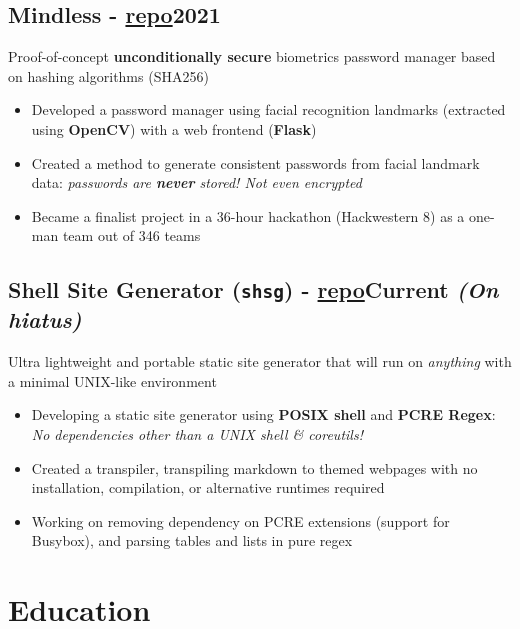 \documentclass[9pt]{article}
\begin{document}
\subsection{Mindless \normalsize\textnormal{- \href{https://github.com/ianayl/mindless}{repo}}\hfill \normalsize\textnormal{2021}}
    Proof-of-concept \textbf{unconditionally secure} biometrics password manager based on hashing algorithms (SHA256)
    \vspace{-0.5em}
\begin{itemize}
  \item Developed a password manager using facial recognition landmarks (extracted using \textbf{OpenCV}) with a web frontend (\textbf{Flask})
  \item Created a method to generate consistent passwords from facial landmark data: \textit{passwords are \textbf{never} stored! Not even encrypted}
    \item Became a finalist project in a 36-hour hackathon (Hackwestern 8) as a one-man team out of 346 teams
\end{itemize}


\subsection{Shell Site Generator (\texttt{shsg}) \normalsize\textnormal{- \href{https://github.com/ianayl/shsg}{repo}}\hfill \normalsize\textnormal{Current \textit{(On hiatus)}}}
  Ultra lightweight and portable static site generator that will run on \textit{anything} with a minimal UNIX-like environment
\vspace{-0.5em}
\begin{itemize}
  \item Developing a static site generator using \textbf{POSIX shell} and \textbf{PCRE Regex}: \textit{No dependencies other than a UNIX shell \& coreutils!}
  \item Created a transpiler, transpiling markdown to themed webpages with no installation, compilation, or alternative runtimes required
    \item Working on removing dependency on PCRE extensions (support for Busybox), and parsing tables and lists in pure regex
\end{itemize}

\section{Education}
\end{document}
